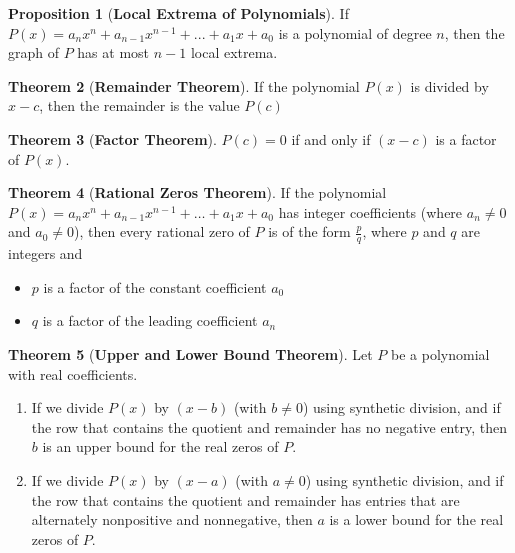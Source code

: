 \documentclass{article}
\theoremstyle{definition}
\newtheorem{theorem}{Theorem}[section]
\newtheorem{proposition}[theorem]{Proposition}
\begin{document}
\begin{proposition}[\textbf{Local Extrema of Polynomials}]
    If $P(x)=a_nx^n+a_{n-1}x^{n-1}+...+a_1x+a_0$
    is a polynomial of degree $n$, then the graph of $P$ has at most $n-1$ local extrema.
    \cite{stewart2015precalculus}
\end{proposition}

\begin{theorem}[\textbf{Remainder Theorem}]
    If the polynomial $P(x)$ is divided by $x-c$, then the remainder is the value $P(c)$
    \cite{stewart2015precalculus}
\end{theorem}

\begin{theorem}[\textbf{Factor Theorem}]
    \( P(c) = 0 \) if and only if \( (x - c) \) is a factor of \( P(x) \).
    \cite{stewart2015precalculus}
\end{theorem}

\begin{theorem}[\textbf{Rational Zeros Theorem}]
    If the polynomial $P(x) = a_n x^n + a_{n-1} x^{n-1} + \ldots + a_1 x + a_0$ has integer coefficients (where $a_n \neq 0$ and $a_0 \neq 0$), then every rational zero of $P$ is of the form $\frac{p}{q}$, where $p$ and $q$ are integers and
    \begin{itemize}
        \item $p$ is a factor of the constant coefficient $a_0$
        \item $q$ is a factor of the leading coefficient $a_n$
    \end{itemize}
    \cite{stewart2015precalculus}
\end{theorem}

\begin{theorem}[\textbf{Upper and Lower Bound Theorem}]
    Let $P$ be a polynomial with real coefficients.
    \begin{enumerate}
        \item If we divide $P(x)$ by $(x - b)$ (with $b \neq 0$) using synthetic division, and if the row that contains the quotient and remainder has no negative entry, then $b$ is an upper bound for the real zeros of $P$.
        \item If we divide $P(x)$ by $(x - a)$ (with $a \neq 0$) using synthetic division, and if the row that contains the quotient and remainder has entries that are alternately nonpositive and nonnegative, then $a$ is a lower bound for the real zeros of $P$.
    \end{enumerate}
    \cite{stewart2015precalculus}
\end{theorem}
\end{document}
